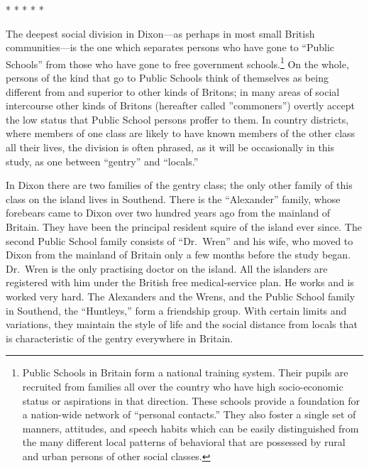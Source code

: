 \documentclass[openany,nobib]{tufte-book}
\begin{document}
\vspace{.2in}
\begin{centering}

\Large{* * * * *}

\end{centering}
\vspace{.17in}

\noindent The deepest social division in Dixon---as perhaps in most small British
communities---is the one which separates persons who have gone to
``Public Schools'' from those who have gone to free government
schools.\footnote{Public Schools in Britain form a national training
  system. Their pupils are recruited from families all over the country
  who have high socio-economic status or aspirations in that direction.
  These schools provide a foundation for a nation-wide network of
  ``personal contacts.'' They also foster a single set of manners,
  attitudes, and speech habits which can be easily distinguished from
  the many different local patterns of behavioral that are possessed by
  rural and urban persons of other social classes.} On the whole,
persons of the kind that go to Public Schools think of themselves as
being different from and superior to other kinds of Britons; in many
areas of social intercourse other kinds of Britons (hereafter called
''commoners'') overtly accept the low status that Public School persons
proffer to them. In country districts, where members of one class are
likely to have known members of the other class all their lives, the
division is often phrased, as it will be occasionally in this study, as
one between ``gentry'' and ``locals.''

In Dixon there are two families of the gentry class; the only other
family of this class on the island lives in Southend. There is the
``Alexander'' family, whose forebears came to Dixon over two hundred
years ago from the mainland of Britain. They have been the principal
resident squire of the island ever since. The second Public School
family consists of ``Dr.~Wren'' and his wife, who moved to Dixon from
the mainland of Britain only a few months before the study began.
Dr.~Wren is the only practising doctor on the island. All the islanders
are registered with him under the British free medical-service plan. He
works and is worked very hard. The Alexanders and the Wrens, and the
Public School family in Southend, the ``Huntleys,'' form a friendship
group. With certain limits and variations, they maintain the style of
life and the social distance from locals that is characteristic of the
gentry everywhere in Britain.
\end{document}
